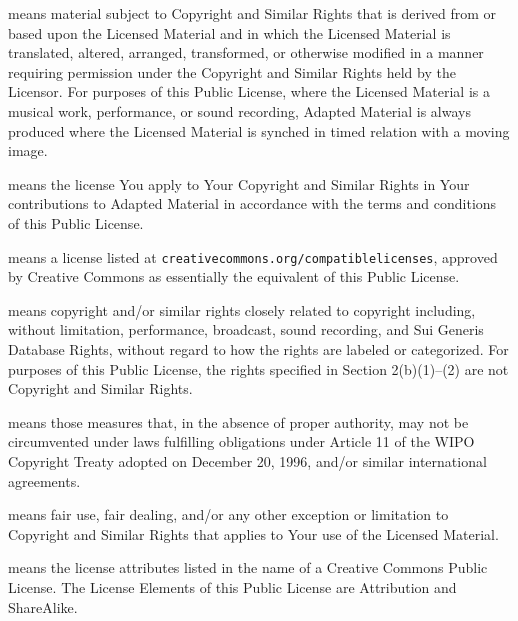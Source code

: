 \begin{description}[
		style=nextline,
		leftmargin=0pt,
		labelindent=0pt,
		font=\normalfont\bfseries\sffamily,
		itemsep=0.7em,
		parsep=0pt
	]
	\item[Adapted Material]
	      means material subject to Copyright and Similar Rights that is derived from or based upon the Licensed Material and in which the Licensed Material is translated, altered, arranged, transformed, or otherwise modified in a manner requiring permission under the Copyright and Similar Rights held by the Licensor. For purposes of this Public License, where the Licensed Material is a musical work, performance, or sound recording, Adapted Material is always produced where the Licensed Material is synched in timed relation with a moving image.

	\item[Adapter's License]
	      means the license You apply to Your Copyright and Similar Rights in Your contributions to Adapted Material in accordance with the terms and conditions of this Public License.

	\item[BY-SA Compatible License]
	      means a license listed at \nolinkurl{creativecommons.org/compatiblelicenses}, approved by Creative Commons as essentially the equivalent of this Public License.

	\item[Copyright and Similar Rights]
	      means copyright and/or similar rights closely related to copyright including, without limitation, performance, broadcast, sound recording, and Sui Generis Database Rights, without regard to how the rights are labeled or categorized. For purposes of this Public License, the rights specified in Section 2(b)(1)--(2) are not Copyright and Similar Rights.

	\item[Effective Technological Measures]
	      means those measures that, in the absence of proper authority, may not be circumvented under laws fulfilling obligations under Article 11 of the WIPO Copyright Treaty adopted on December 20, 1996, and/or similar international agreements.

	\item[Exceptions and Limitations]
	      means fair use, fair dealing, and/or any other exception or limitation to Copyright and Similar Rights that applies to Your use of the Licensed Material.

	\item[License Elements]
	      means the license attributes listed in the name of a Creative Commons Public License. The License Elements of this Public License are Attribution and ShareAlike.


\end{description}

